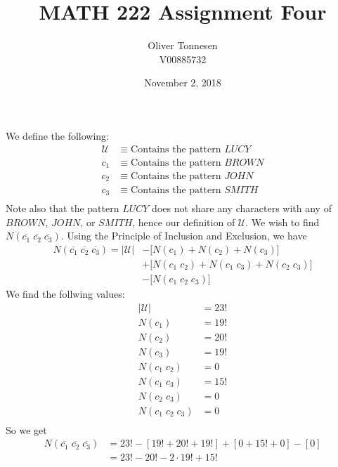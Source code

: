 \documentclass{article}
\title{MATH 222 Assignment Four}
\author{Oliver Tonnesen\\V00885732}
\date{November 2, 2018}
\begin{document}
\maketitle
\renewcommand{\thesubsection}{\thesection.\alph{subsection}}
\section{} %
We define the following:
\begin{align*}
	\mathcal{U}&\equiv\text{Contains the pattern $LUCY$}\\
	c_1&\equiv\text{Contains the pattern $BROWN$}\\
	c_2&\equiv\text{Contains the pattern $JOHN$}\\
	c_3&\equiv\text{Contains the pattern $SMITH$}\\
\end{align*}
Note also that the pattern $LUCY$ does not share any characters with any of
$BROWN$, $JOHN$, or $SMITH$, hence our definition of $\mathcal{U}$.
\newline
\newline
We wish to find $N(\overline{c_1}\;\overline{c_2}\;\overline{c_3})$. Using the
Principle of Inclusion and Exclusion, we have
\begin{align*}
	N(\overline{c_1}\;\overline{c_2}\;\overline{c_3})=
	|\mathcal{U}|
	&-\big[N(c_1)+N(c_2)+N(c_3)\big]\\
	&+\big[N(c_1\;c_2)+N(c_1\;c_3)+N(c_2\;c_3)\big]\\
	&-\big[N(c_1\;c_2\;c_3)\big]
\end{align*}
We find the follwing values:
\begin{align*}
	|\mathcal{U}|&=23!\\
	N(c_1)&=19!\\
	N(c_2)&=20!\\
	N(c_3)&=19!\\
	N(c_1\;c_2)&=0\\
	N(c_1\;c_3)&=15!\\
	N(c_2\;c_3)&=0\\
	N(c_1\;c_2\;c_3)&=0\\
\end{align*}
So we get
\begin{align*}
	N(\overline{c_1}\;\overline{c_2}\;\overline{c_3})&=23!-[19!+20!+19!]+[0+15!+0]-[0]\\
	&=23!-20!-2\cdot19!+15!
\end{align*}
\end{document}
